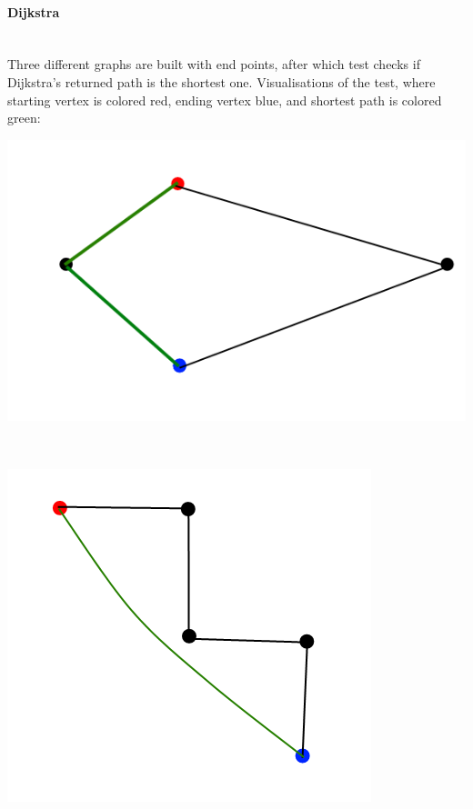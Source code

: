 \documentclass[a4paper,12pt]{article}
\begin{document}
\paragraph{\large Dijkstra} \hspace{0pt} \\
Three different graphs are built with end points, after which test checks if Dijkstra's returned path is the shortest one. Visualisations of the test, where starting vertex is colored red, ending vertex blue, and shortest path is colored green:\\
\centerline{\includegraphics[scale=0.5]{dij1.png}} \hspace*{\fill} \\
\centerline{\includegraphics[scale=0.5]{dij2.png}} \hspace*{\fill} \\
\end{document}
